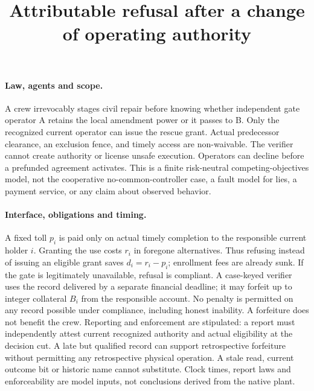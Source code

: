 \documentclass[11pt]{article}
\title{Attributable refusal after a change of operating authority}
\begin{document}
\maketitle
\paragraph{Law, agents and scope.}
A crew irrevocably stages civil repair before knowing whether independent
gate operator A retains the local amendment power or it passes to B.
Only the recognized current operator can issue the rescue grant.
Actual predecessor clearance, an exclusion fence, and timely access
are non-waivable. The verifier cannot create authority or license
unsafe execution. Operators can decline before a prefunded agreement
activates. This is a finite risk-neutral competing-objectives model,
not the cooperative no-common-controller case, a fault model for lies,
a payment service, or any claim about observed behavior.

\paragraph{Interface, obligations and timing.}
A fixed toll \(p_i\) is paid only on actual timely completion to
the responsible current holder \(i\). Granting the use costs \(r_i\)
in foregone alternatives. Thus refusing instead of issuing an eligible
grant saves \(d_i=r_i-p_i\); enrollment fees are already sunk.
If the gate is legitimately unavailable, refusal is compliant.
A case-keyed verifier uses the record delivered by a separate
financial deadline; it may forfeit up to integer collateral \(B_i\)
from the responsible account. No penalty is permitted on any record
possible under compliance, including honest inability. A forfeiture
does not benefit the crew. Reporting and enforcement are stipulated:
a report must independently attest current recognized authority and
actual eligibility at the decision cut. A late but qualified record can
support retrospective forfeiture without permitting any retrospective
physical operation. A stale read, current outcome bit or historic name
cannot substitute. Clock times, report laws and enforceability are
model inputs, not conclusions derived from the native plant.
\end{document}
